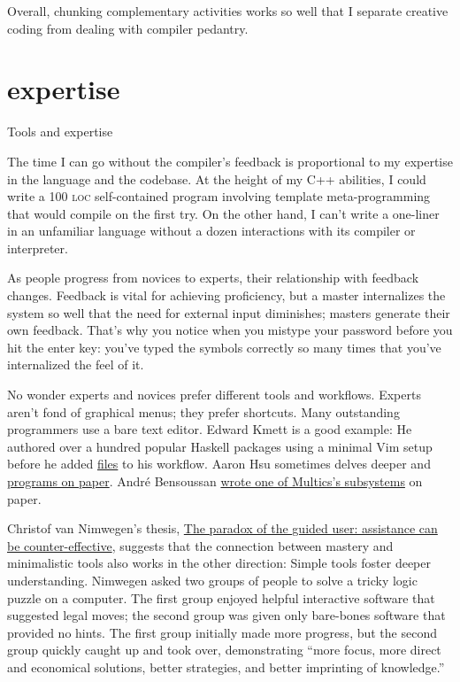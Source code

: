 \documentclass{article}
\begin{document}
Overall, chunking complementary activities works so well
that I separate creative coding from dealing with compiler pedantry.

\section{expertise}{Tools and expertise}

The time I can go without the compiler's feedback is proportional to my expertise in the language and the codebase.
At the height of my C++ abilities,
I could write a 100 \textsc{loc} self-contained program involving template meta-programming that would compile on the first try.
On the other hand,
I can't write a one-liner in an unfamiliar language without a dozen interactions with its compiler or interpreter.

As people progress from novices to experts,
their relationship with feedback changes.
Feedback is vital for achieving proficiency,
but a master internalizes the system so well that the need for external input diminishes;
masters generate their own feedback.
That's why you notice when you mistype your password before you hit the enter key:
you've typed the symbols correctly so many times that you've internalized the feel of it.

No wonder experts and novices prefer different tools and workflows.
Experts aren't fond of graphical menus; they prefer shortcuts.
Many outstanding programmers use a bare text editor.
Edward Kmett is a good example:
He authored over a hundred popular Haskell packages using a minimal Vim setup
before he added \href{https://neovim.io/doc/user/tagsrch.html}{ files} to his workflow.
Aaron Hsu sometimes delves deeper and \href{https://www.sacrideo.us/paper-is-dead-long-live-paper-programming/}{programs on paper}.
André Bensoussan \href{https://www.multicians.org/andre.html}{wrote one of Multics's subsystems} on paper.

Christof van Nimwegen's thesis,
\href{https://dspace.library.uu.nl/bitstream/handle/1874/26875/nimwegen.pdf}{The paradox of the guided user: assistance can be counter-effective},
suggests that the connection between mastery and minimalistic tools also works in the other direction:
Simple tools foster deeper understanding.
Nimwegen asked two groups of people to solve a tricky logic puzzle on a computer.
The first group enjoyed helpful interactive software that suggested legal moves;
the second group was given only bare-bones software that provided no hints.
The first group initially made more progress,
but the second group quickly caught up and took over,
demonstrating ``more focus, more direct and economical solutions, better strategies, and better imprinting of knowledge.''
\end{document}
